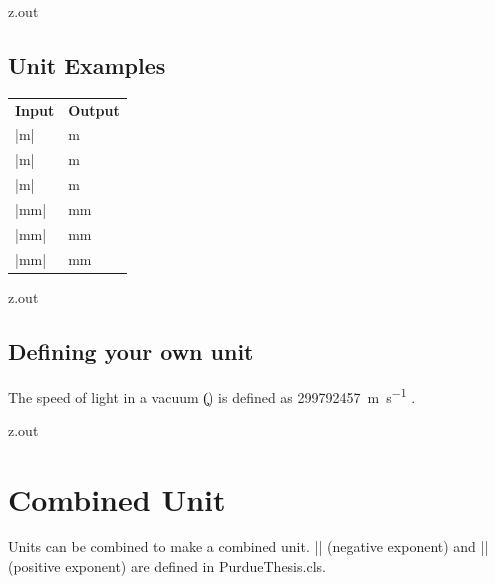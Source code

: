 \begin{VerbatimOut}{z.out}

\subsection{Unit Examples}

{
  \noindent
  \hspace*{2\parindent}\begin{tabular}{@{}ll@{}}
    \textbf{Input}& \textbf{Output}\\
    \tabularspace
    |\unit{\meter}|&       \unit{\meter}\\
    |\unit{\m}|&           \unit{\m}\\
    |\unit{m}|&            \unit{m}\\[6pt]
    |\unit{\milli\meter}|& \unit{\milli\meter}\\                                  
    |\unit{\mm}|&          \unit{\mm}\\
    |\unit{mm}|&           \unit{mm}\\[6pt]
  \end{tabular}
}
\end{VerbatimOut}

\MyIO


\begin{VerbatimOut}{z.out}
  
\subsection{Defining your own unit}

The speed of light in a vacuum (\unit{\c}) is defined as \qty{299792457}{m\per s}
\cite{wikipedia-speed-of-light}.
\end{VerbatimOut}

\MyIO


\begin{VerbatimOut}{z.out}

\section{Combined Unit}

Units can be combined to make a combined unit.
|\NE| (negative exponent)
and |\PE| (positive exponent)
are defined in PurdueThesis.cls.
\end{VerbatimOut}

